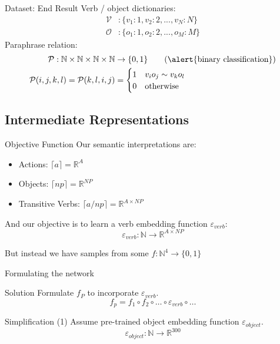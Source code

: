 \documentclass{beamer}
\begin{document}
\begin{frame}{Dataset: End Result}
	Verb / object dictionaries:
	\begin{align*}
	\mathcal{V}&: \{v_1: 1, v_2: 2, ..., v_N: N\}\\
	\mathcal{O}&: \{o_1: 1, o_2: 2, ..., o_M: M\}
	\end{align*}
	Paraphrase relation: 
	\begin{align*}
	\mathcal{P}: \mathbb{N} \times \mathbb{N} \times \mathbb{N} \times \mathbb{N} &\to \{0, 1\} \tag{\alert{binary classification}}\\
	\mathcal{P}(i,j,k,l) = \mathcal{P}(k,l,i,j)
	 &= \begin{cases}
	1 & v_i o_j \sim v_k o_l\\
	0 & \text{otherwise}\\
	\end{cases}
	\end{align*}	
\end{frame}
  
\subsection{Intermediate Representations}
  \begin{frame}{Objective Function}
    Our semantic interpretations are:
  	\begin{itemize}
  	\item Actions: $ \lceil a \rceil = \mathbb{R}^{A}$
  	\item Objects: $ \lceil np \rceil = \mathbb{R}^{NP}$
  	\item Transitive Verbs: $\lceil a / np \rceil = \mathbb{R}^{A\times NP}$
  	\end{itemize}
  
  	And our objective is to learn a \alert{verb embedding function} 
  	$\varepsilon_{verb}$:
  	\[
  	\varepsilon_{verb}: \mathbb{N} \to \mathbb{R}^{A\times NP}
  	\]
  	
  	But instead we have samples from some $f: \mathbb{N}^4 \to \{0,1\}$ 
  	

  	
\end{frame}

\begin{frame}{Formulating the network}
  	\begin{block}{Solution}
	Formulate $f_P$ to incorporate $\varepsilon_{verb}$.
	\[
	f_p = f_1 \circ f_2 \circ \dots \circ \varepsilon_{verb} \circ \dots
	\] 
  	\end{block}
  	 
  	\pause
  	\begin{block}{Simplification (1)}
  	Assume pre-trained \alert{object embedding function} $\varepsilon_{object}$.
  	\[
  	\varepsilon_{object}: \mathbb{N} \to \mathbb{R}^{300}
  	\]
  	\end{block}
\end{frame}
\end{document}
